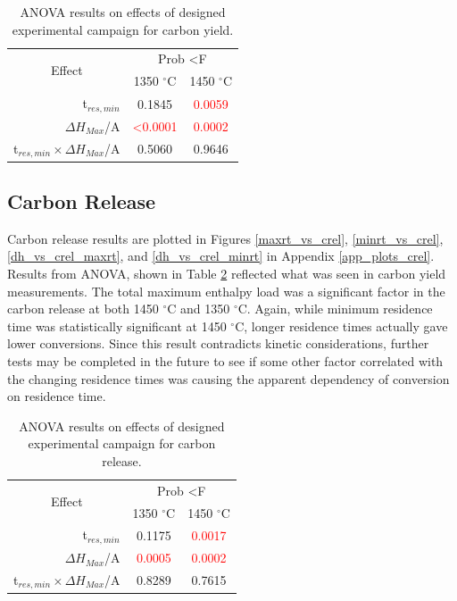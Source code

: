 \documentclass[11pt,twocolumn]{article}
\begin{document}
\begin{table}
	\centering
	\caption{ANOVA results on effects of designed experimental campaign for carbon yield.}
	\begin{tabular}{r c c}
		\toprule
		\multicolumn{1}{c}{\multirow{2}{*}{Effect}}		& 	\multicolumn{2}{c}{Prob \textless F	}	\\
		{}								&	1350 $^\circ$C					&	1450 $^\circ$C			\\
		\midrule
		t$_{res,min}$						&	0.1845						&	\textcolor{red}{0.0059}	\\
		$\Delta H_{Max}$/A					&	\textcolor{red}{\textless 0.0001}	&	\textcolor{red}{0.0002}	\\
		t$_{res,min}\times \Delta H_{Max}$/A	&	0.5060						&	0.9646				\\
		\bottomrule
	\end{tabular}
	\label{anova_cyield}
\end{table}


\subsection*{Carbon Release}

Carbon release results are plotted in Figures \ref{maxrt_vs_crel}, \ref{minrt_vs_crel}, \ref{dh_vs_crel_maxrt}, and \ref{dh_vs_crel_minrt} in Appendix \ref{app_plots_crel}.  Results from ANOVA, shown in Table \ref{anova_crel} reflected what was seen in carbon yield measurements.  The total maximum enthalpy load was a significant factor in the carbon release at both 1450 $^\circ$C and 1350 $^\circ$C.  Again, while minimum residence time was statistically significant at 1450 $^\circ$C, longer residence times actually gave lower conversions.  Since this result contradicts kinetic considerations, further tests may be completed in the future to see if some other factor correlated with the changing residence times was causing the apparent dependency of conversion on residence time.

\begin{table}
	\centering
	\caption{ANOVA results on effects of designed experimental campaign for carbon release.}
	\begin{tabular}{r c c}
		\toprule
		\multicolumn{1}{c}{\multirow{2}{*}{Effect}}		& 	\multicolumn{2}{c}{Prob \textless F	}	\\
		{}								&	1350 $^\circ$C			&	1450 $^\circ$C			\\
		\midrule
		t$_{res,min}$						&	0.1175				&	\textcolor{red}{0.0017}	\\
		$\Delta H_{Max}$/A					&	\textcolor{red}{0.0005}	&	\textcolor{red}{0.0002}	\\
		t$_{res,min}\times \Delta H_{Max}$/A	&	0.8289				&	0.7615				\\
		\bottomrule
	\end{tabular}
	\label{anova_crel}
\end{table}
\end{document}
